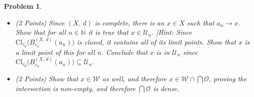 \documentclass{article}
\theoremstyle{normal}
\newtheorem{problem}{Problem}
\begin{document}
\begin{problem}
\begin{itemize}
                such that
                $B_{r_{0}}^{(X,\,d)}(a_{0})\subseteq\mathcal{U}_{0}\cap\mathcal{W}$.
                By the previous part of the problem, there is a positive
                $\varepsilon_{0}<r_{0}$ such that
                $\textrm{Cl}_{\tau_{d}}\big(B_{\varepsilon_{0}}^{(X,\,d)}(a_{0})\big)\subseteq{B}_{r_{0}}^{(X,\,d)}(a_{0})$.
                Recursively we may define $a_{n}$, $r_{n}$, and
                $\varepsilon_{n}$ such that $r_{n}<\frac{1}{n+1}$, and:
                \begin{equation}
                    \textrm{Cl}_{\tau_{d}}
                        \big(B_{\varepsilon_{n}}^{(X,\,d)}(a_{n})\big)
                    \subseteq{B}_{r_{n}}^{(X,\,d)}(a_{n})
                    \subseteq\mathcal{W}\cap\bigcap_{k=0}^{n}\mathcal{U}_{n}
                \end{equation}
                and such that:
                \begin{equation}
                    \textrm{Cl}_{\tau_{d}}
                        \big(B_{\varepsilon_{n+1}}^{(X,\,d)}(a_{n+1})\big)
                        \subseteq{B}_{\varepsilon_{n}}^{(X,\,d)}(a_{n})
                \end{equation}
                Show that $a:\mathbb{N}\rightarrow{X}$ is a Cauchy sequence.
            \item (2 Points) Since $(X,\,d)$ is complete, there is an $x\in{X}$
                such that $a_{n}\rightarrow{x}$. Show that for all
                $n\in\mathbb{N}$ it is true that $x\in\mathcal{U}_{n}$.
                [Hint: Since $\textrm{Cl}_{\tau_{d}}\big(B_{\varepsilon_{n}}^{(X,\,d)}(a_{n})\big)$
                is closed, it contains all of its limit points. Show that
                $x$ is a limit point of this for all $n$. Conclude that
                $x$ is in $\mathcal{U}_{n}$ since
                $\textrm{Cl}_{\tau_{d}}\big(B_{\varepsilon_{n}}^{(X,\,d)}(a_{n})\big)\subseteq\mathcal{U}_{n}$.
            \item (2 Points) Show that $x\in\mathcal{W}$ as well, and therefore
                $x\in\mathcal{W}\cap\bigcap\mathcal{O}$, proving the
                intersection is non-empty, and therefore $\bigcap\mathcal{O}$
                is dense.
        \end{itemize}
    \end{problem}
\end{document}
